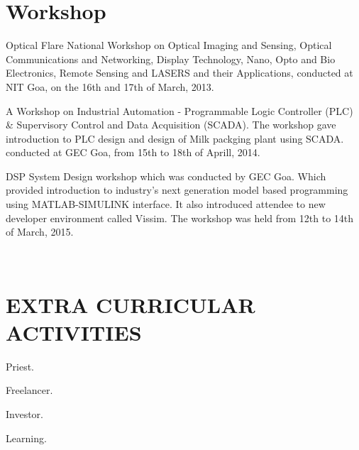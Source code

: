 \documentclass[fontsize=11pt]{tccv}
\begin{document}
\section{Workshop}
\begin{skills}
\item {Optical Flare National Workshop on Optical Imaging and Sensing, Optical Communications and Networking, Display Technology, Nano, Opto and Bio Electronics, Remote Sensing and LASERS and their Applications, conducted at NIT Goa, on the 16th and 17th of March, 2013. }
\item {A Workshop on Industrial Automation - Programmable Logic Controller (PLC) \& Supervisory Control and Data Acquisition (SCADA). The workshop gave introduction to PLC design and design of Milk packging plant using  SCADA.  conducted at GEC Goa, from  15th to 18th of Aprill, 2014. }
\item {DSP System Design workshop which was conducted by GEC Goa. Which provided introduction to industry’s next generation model based programming using MATLAB-SIMULINK interface. It also introduced attendee to new developer environment called Vissim. The workshop was  held from 12th to 14th of March, 2015. }
\end{skills}\\
\vspace{1em}


\section{EXTRA CURRICULAR ACTIVITIES}
\begin{skills}
\item {Priest.}
\item{Freelancer.}
\item{Investor.}
\item{Learning.}
\end{skills}
\vspace{1em}
\end{document}
